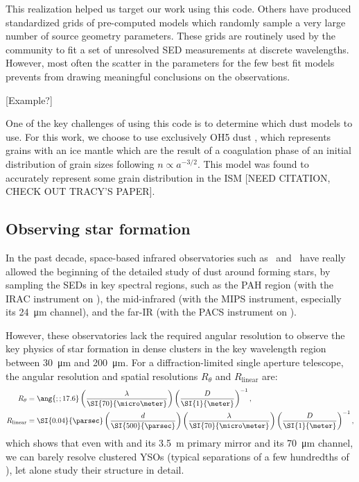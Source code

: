 This realization helped us target our work using this code. Others \citep[e.g][]{Robitaille:2006cb} have produced standardized grids of pre-computed models which randomly sample a very large number of source geometry parameters. These grids are routinely used by the community to fit a set of unresolved SED measurements at discrete wavelengths. However, most often the scatter in the parameters for the few best fit models prevents from drawing meaningful conclusions on the observations. 

[Example?]

One of the key challenges of using this code is to determine which dust models to use. For this work, we choose to use exclusively OH5 dust \citep{Ossenkopf:1994tq}, which represents grains with an ice mantle which are the result of a coagulation phase of an initial distribution of grain sizes following $n\propto a^{-3/2}$. This model was found to accurately represent some grain distribution in the ISM [NEED CITATION, CHECK OUT TRACY'S PAPER].

\subsection{Observing star formation}

In the past decade, space-based infrared observatories such as \Spitzer\ and \Herschel\ have really allowed the beginning of the detailed study of dust around forming stars, by sampling the SEDs in key spectral regions, such as the PAH region (with the IRAC instrument on \Spitzer), the mid-infrared (with the MIPS instrument, especially its \SI{24}{\micro\meter} channel), and the far-IR (with the PACS instrument on \Herschel). 

However, these observatories lack the required angular resolution to observe the key physics of star formation in dense clusters in the key wavelength region between \SI{30}{\micro\meter} and \SI{200}{\micro\meter}. For a diffraction-limited single aperture telescope, the angular resolution and spatial resolutions $R_\theta$ and $R_\textrm{linear}$ are:
\begin{align}
R_\theta &= \ang{;;17.6}\left(\frac{\lambda}{\SI{70}{\micro\meter}}\right)\left(\frac{D}{\SI{1}{\meter}}\right)^{-1}, \\
R_\textrm{linear} &= \SI{0.04}{\parsec}\left(\frac{d}{\SI{500}{\parsec}}\right)\left(\frac{\lambda}{\SI{70}{\micro\meter}}\right)\left(\frac{D}{\SI{1}{\meter}}\right)^{-1},
\end{align}
which shows that even with \Herschel and its \SI{3.5}{\meter} primary mirror and its \SI{70}{\micro\meter} channel, we can barely resolve clustered YSOs (typical separations of a few hundredths of \si{\parsec}), let alone study their structure in detail. 

